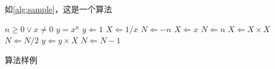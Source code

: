 \par 如\autoref{alg:sample}，这是一个算法

\begin{algorithm}[H]
    \begin{algorithmic} %
        \REQUIRE $n \geq 0 \vee x \neq 0$
        \ENSURE $y = x^n$
        \STATE $y \Leftarrow 1$
            \STATE $X \Leftarrow 1 / x$
            \STATE $N \Leftarrow -n$
        \ELSE
            \STATE $X \Leftarrow x$
            \STATE $N \Leftarrow n$
        \ENDIF
                \STATE $X \Leftarrow X \times X$
                \STATE $N \Leftarrow N / 2$
            \ELSE[$N$ is odd]
                \STATE $y \Leftarrow y \times X$
                \STATE $N \Leftarrow N - 1$
            \ENDIF
        \ENDWHILE
    \end{algorithmic}
    \caption{\label{alg:sample}算法样例}
\end{algorithm}